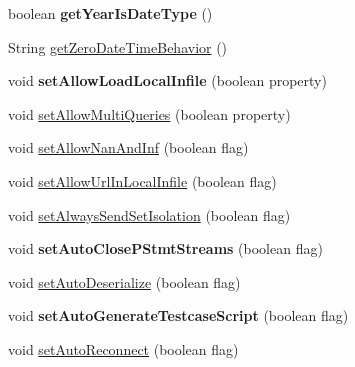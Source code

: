 \begin{DoxyCompactItemize}
boolean {\bfseries get\+Year\+Is\+Date\+Type} ()
\item 
String \mbox{\hyperlink{classcom_1_1mysql_1_1jdbc_1_1_multi_host_my_s_q_l_connection_a7f3732fae7bbb72f1fdccbe5fe5931bd}{get\+Zero\+Date\+Time\+Behavior}} ()
\item 
\mbox{\label{classcom_1_1mysql_1_1jdbc_1_1_multi_host_my_s_q_l_connection_a0525efcd2c50f551880f2885cda2b685}} 
void {\bfseries set\+Allow\+Load\+Local\+Infile} (boolean property)
\item 
void \mbox{\hyperlink{classcom_1_1mysql_1_1jdbc_1_1_multi_host_my_s_q_l_connection_a0a2fefd00cc98baf06444ff815a8066d}{set\+Allow\+Multi\+Queries}} (boolean property)
\item 
void \mbox{\hyperlink{classcom_1_1mysql_1_1jdbc_1_1_multi_host_my_s_q_l_connection_a301b4bf7a1c4e8bdbf15cc7a977cd0b8}{set\+Allow\+Nan\+And\+Inf}} (boolean flag)
\item 
void \mbox{\hyperlink{classcom_1_1mysql_1_1jdbc_1_1_multi_host_my_s_q_l_connection_a65ced19d9988a77826c138d8d2f1574e}{set\+Allow\+Url\+In\+Local\+Infile}} (boolean flag)
\item 
void \mbox{\hyperlink{classcom_1_1mysql_1_1jdbc_1_1_multi_host_my_s_q_l_connection_af0ef05e04bfe22b5ac3e8108ea2bc3cc}{set\+Always\+Send\+Set\+Isolation}} (boolean flag)
\item 
\mbox{\label{classcom_1_1mysql_1_1jdbc_1_1_multi_host_my_s_q_l_connection_a41b157ff02eec80177b0ecec6998e6a3}} 
void {\bfseries set\+Auto\+Close\+P\+Stmt\+Streams} (boolean flag)
\item 
void \mbox{\hyperlink{classcom_1_1mysql_1_1jdbc_1_1_multi_host_my_s_q_l_connection_a893d57a444b9a9bb7791efc34450b259}{set\+Auto\+Deserialize}} (boolean flag)
\item 
\mbox{\label{classcom_1_1mysql_1_1jdbc_1_1_multi_host_my_s_q_l_connection_a79dff9a4edf2fde98b9f9ba978328c94}} 
void {\bfseries set\+Auto\+Generate\+Testcase\+Script} (boolean flag)
\item 
void \mbox{\hyperlink{classcom_1_1mysql_1_1jdbc_1_1_multi_host_my_s_q_l_connection_a5444b292e218f16cfc2baadf784c35ab}{set\+Auto\+Reconnect}} (boolean flag)
\item 
\mbox{\label{classcom_1_1mysql_1_1jdbc_1_1_multi_host_my_s_q_l_connection_afaa7345e28e015959254cdfaeb84a046}} 

\end{DoxyCompactItemize}
